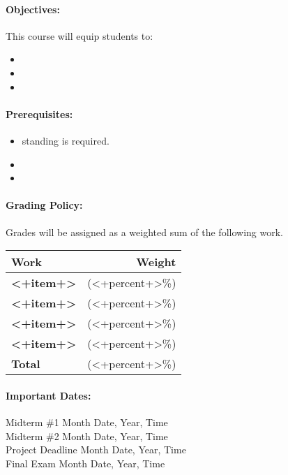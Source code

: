 \documentclass[11pt, a4paper]{article}
\begin{document}
\paragraph{Objectives:} 

This course will equip students to:

\begin{itemize}
\item <+objective+>
\item <+objective+>
\item <+objective+>
\end{itemize}

\paragraph{Prerequisites:} 
\begin{itemize}
\item <+standing+> standing is required.
\item <+required courses+>
\item <+other+>
\end{itemize}

\paragraph{Grading Policy:} Grades will be assigned as a weighted sum of the following work. 

\begin{table}[h]
\begin{tabularx}{\textwidth}{Xr}
\textbf{Work} & \textbf{Weight}\\
\hline
\textbf{<+item+>} & (<+percent+>\%) \\
\textbf{<+item+>} & (<+percent+>\%) \\
\textbf{<+item+>} & (<+percent+>\%) \\
\textbf{<+item+>} & (<+percent+>\%) \\
\hline
\textbf{Total} & (<+percent+>\%) \\
\end{tabularx}
\end{table}

\paragraph{Important Dates:}
\begin{center} \begin{minipage}{3.8in}
\begin{flushleft}
Midterm \#1      \dotfill Month Date, Year, Time  \\
Midterm \#2      \dotfill Month Date, Year, Time  \\
Project Deadline      \dotfill Month Date, Year, Time  \\
Final Exam      \dotfill Month Date, Year, Time  \\
\end{flushleft}
\end{minipage}
\end{center}
\end{document}
